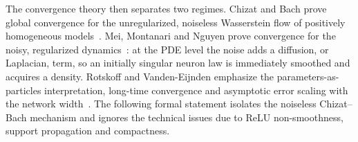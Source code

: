 The convergence theory then separates two regimes. Chizat and Bach prove global convergence for the unregularized, noiseless Wasserstein flow of positively homogeneous models~\cite{ChizatBach2018OverparameterizedOT}. Mei, Montanari and Nguyen prove convergence for the noisy, regularized dynamics~\cite{MeiMontanariNguyen2018MeanFieldNN}: at the PDE level the noise adds a diffusion, or Laplacian, term, so an initially singular neuron law is immediately smoothed and acquires a density. Rotskoff and Vanden-Eijnden emphasize the parameters-as-particles interpretation, long-time convergence and asymptotic error scaling with the network width~\cite{RotskoffVandenEijnden2018Trainability}. The following formal statement isolates the noiseless Chizat--Bach mechanism and ignores the technical issues due to ReLU non-smoothness, support propagation and compactness.

